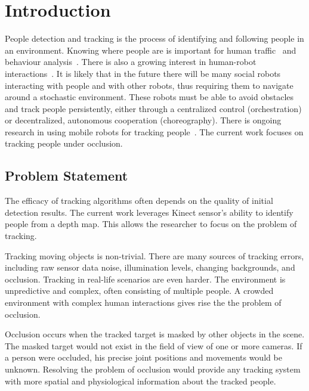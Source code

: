 


\chapter{Introduction}

\label{chapter:introduction}

People detection and tracking is the process of identifying and following people in an environment. Knowing where people are is important for human traffic~\cite{yang_count_people} and behaviour analysis~\cite{seer_pedestrian_behaviour, arar_gaze_estimation}. There is also a growing interest in human-robot interactions~\cite{mutlu_human_robot_interaction}. It is likely that in the future there will be many social robots interacting with people and with other robots, thus requiring them to navigate around a stochastic environment. These robots must be able to avoid obstacles and track people persistently, either through a centralized control (orchestration) or decentralized, autonomous cooperation (choreography). There is ongoing research in using mobile robots for tracking people~\cite{choi_indoor_robots, munaro_tracking_within_groups_with_mobile_robot, munaro_tracking_2, glas_people_tracking_robot_localization, satake_stereo_robot}. The current work focuses on tracking people under occlusion.

\section{Problem Statement}
\label{sec:introduction_problem_statement}

The efficacy of tracking algorithms often depends on the quality of initial detection results. The current work leverages Kinect sensor's ability to identify people from a depth map. This allows the researcher to focus on the problem of tracking.

Tracking moving objects is non-trivial. There are many sources of tracking errors, including raw sensor data noise, illumination levels, changing backgrounds, and occlusion. Tracking in real-life scenarios are even harder. The environment is unpredictive and complex, often consisting of multiple people. A crowded environment with complex human interactions gives rise the the problem of occlusion.

Occlusion occurs when the tracked target is masked by other objects in the scene. The masked target would not exist in the field of view of one or more cameras. If a person were occluded, his precise joint positions and movements would be unknown. Resolving the problem of occlusion would provide any tracking system with more spatial and physiological information about the tracked people.

